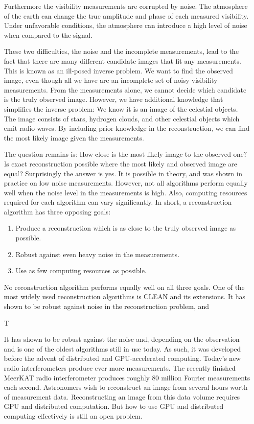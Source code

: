 Furthermore the visibility measurements are corrupted by noise. The atmosphere of the earth can change the true amplitude and phase of each measured visibility. Under unfavorable conditions, the atmosphere can introduce a high level of noise when compared to the signal.

These two difficulties, the noise and the incomplete measurements, lead to the fact that there are many different candidate images that fit any measurements.  This is known as an ill-posed inverse problem. We want to find the observed image, even though all we have are an incomplete set of noisy visibility measurements. From the measurements alone, we cannot decide which candidate is the truly observed image. However, we have additional knowledge that simplifies the inverse problem: We know it is an image of the celestial objects. The image consists of stars, hydrogen clouds, and other celestial objects which emit radio waves. By including prior knowledge in the reconstruction, we can find the most likely image given the measurements. 

The question remains is: How close is the most likely image to the observed one? Is exact reconstruction possible where the most likely and observed image are equal? Surprisingly the answer is yes. It is possible in theory\cite{candes2006robust,donoho2006compressed}, and was shown in practice on low noise measurements\cite{dabbech2018cygnus, dabbech2015moresane}. However, not all algorithms perform equally well when the noise level in the measurements is high. Also, computing resources required for each algorithm can vary significantly. In short, a reconstruction algorithm has three opposing goals:
\begin{enumerate}
	\item Produce a reconstruction which is as close to the truly observed image as possible.
	\item Robust against even heavy noise in the measurements.
	\item Use as few computing resources as possible.
\end{enumerate}

No reconstruction algorithm performs equally well on all three goals. One of the most widely used reconstruction algorithms is CLEAN \cite{hogbom1974aperture, rau2011multi} and its extensions. It has shown to be robust against noise in the reconstruction problem, and 

T

 It has shown to be robust against the  noise\cite{offringa2017optimized} and, depending on the observation and is one of the oldest algorithms still in use today. As such, it was developed before the advent of distributed and GPU-accelerated computing. Today's new radio interferometers produce ever more measurements. The recently finished MeerKAT radio interferometer produces roughly 80 million Fourier measurements each second. Astronomers wish to reconstruct an image from several hours worth of measurement data. Reconstructing an image from this data volume requires GPU and distributed computation. But how to use GPU and distributed computing effectively is still an open problem.


